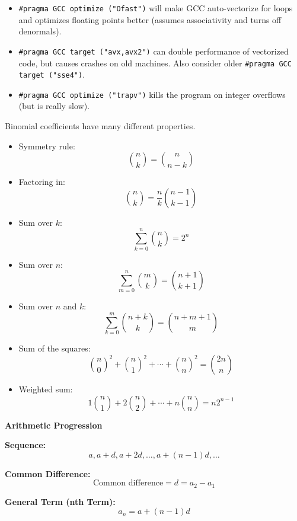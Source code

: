 \fontsize{5.5}{6}\ttfamily
\begin{itemize}[label=•]
    \item \texttt{\#pragma GCC optimize ("Ofast")} will make GCC auto-vectorize for loops and optimizes floating points better (assumes associativity and turns off denormals).
    \item \texttt{\#pragma GCC target ("avx,avx2")} can double performance of vectorized code, but causes crashes on old machines. Also consider older \texttt{\#pragma GCC target ("sse4")}.
    \item \texttt{\#pragma GCC optimize ("trapv")} kills the program on integer overflows (but is really slow).
\end{itemize}


Binomial coefficients have many different properties.
\begin{itemize}
    \item Symmetry rule:
    \[
    \binom{n}{k} = \binom{n}{n-k}
    \]

    \item Factoring in:
    \[
    \binom{n}{k} = \frac{n}{k} \binom{n-1}{k-1}
    \]

    \item Sum over $k$:
    \[
    \sum_{k=0}^{n} \binom{n}{k} = 2^n
    \]

    \item Sum over $n$:
    \[
    \sum_{m=0}^{n} \binom{m}{k} = \binom{n+1}{k+1}
    \]

    \item Sum over $n$ and $k$:
    \[
    \sum_{k=0}^{m} \binom{n+k}{k} = \binom{n+m+1}{m}
    \]

    \item Sum of the squares:
    \[
    \binom{n}{0}^2 + \binom{n}{1}^2 + \cdots + \binom{n}{n}^2 = \binom{2n}{n}
    \]

    \item Weighted sum:
    \[
    1 \binom{n}{1} + 2 \binom{n}{2} + \cdots + n \binom{n}{n} = n 2^{n-1}
    \]
\end{itemize}



\textbf{Arithmetic Progression}

\textbf{Sequence:}
\[ a, a+d, a+2d, \ldots, a+(n-1)d, \ldots \]

\textbf{Common Difference:}
\[ \text{Common difference} = d = a_2 - a_1 \]

\textbf{General Term (nth Term):}
\[ a_n = a + (n-1)d \]

